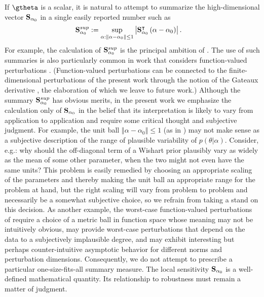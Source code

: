 \documentclass{article}\usepackage[]{graphicx}\usepackage[]{color}
\theoremstyle{definition}
\theoremstyle{plain}
\theoremstyle{plain}
\theoremstyle{plain}
\theoremstyle{definition}
\theoremstyle{plain}
\theoremstyle{plain}
\begin{document}
If $\gtheta$ is a scalar, it is natural to attempt to summarize the
high-dimensional vector $\mathbf{S}_{\alpha_{0}}$ in a single easily reported number
such as
\begin{align*}
\mathbf{S}_{\alpha_{0}}^{sup} & :=\sup_{\alpha:\left\Vert \alpha - \alpha_{0} \right\Vert \le1}
    \left|\mathbf{S}_{\alpha_{0}}^{\intercal}\left(\alpha-\alpha_{0}\right)\right|.
\end{align*}
For example, the calculation of $\mathbf{S}_{\alpha_{0}}^{sup}$ is the principal ambition of
\citet{basu:1996:local}. The use of such summaries is also particularly common
in work that considers function-valued perturbations
\citep[e.g.,][]{gustafson:1996:localposterior,roos:2015:sensitivity}.
(Function-valued perturbations can be connected to the finite-dimensional
perturbations of the present work through the notion of the Gateaux derivative
\citep[Chapter 2.5]{huber:2011:robust}, the elaboration of which we leave to
future work.) Although the summary $\mathbf{S}_{\alpha_{0}}^{sup}$ has obvious merits, in the
present work we emphasize the calculation only of $\mathbf{S}_{\alpha_{0}}$ in the belief that
its interpretation is likely to vary from application to application and require
some critical thought and subjective judgment. For example, the unit ball
$\left\Vert \alpha - \alpha_{0}\right\Vert \le1$ (as in \citet{basu:1996:local}) may not make
sense as a subjective description of the range of plausible variability of
$p\left(\theta\vert\alpha\right)$. Consider, e.g.: why should the off-diagonal term of
a Wishart prior plausibly vary as widely as the mean of some other parameter,
when the two might not even have the same units? This problem is easily remedied
by choosing an appropriate scaling of the parameters and thereby making the unit
ball an appropriate range for the problem at hand, but the right scaling will
vary from problem to problem and necessarily be a somewhat subjective choice, so
we refrain from taking a stand on this decision. As another example, the
worst-case function-valued perturbations of
\citet{gustafson:1996:localmarginals,gustafson:1996:localposterior} require a
choice of a metric ball in function space whose meaning may not be intuitively
obvious, may provide worst-case perturbations that depend on the data to a
subjectively implausible degree, and may exhibit interesting but perhaps
counter-intuitive asymptotic behavior for different norms and perturbation
dimensions. Consequently, we do not attempt to prescribe a particular
one-size-fits-all summary measure. The local sensitivity $\mathbf{S}_{\alpha_{0}}$ is a
well-defined mathematical quantity. Its relationship to robustness must remain a
matter of judgment.
\end{document}
